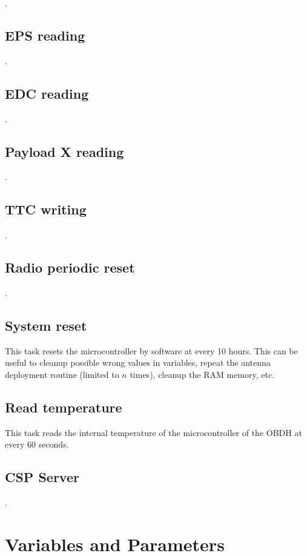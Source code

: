 .

\subsection{EPS reading}

.

\subsection{EDC reading}

.

\subsection{Payload X reading}

.

\subsection{TTC writing}

.

\subsection{Radio periodic reset}

.

\subsection{System reset}

This task resets the microcontroller by software at every 10 hours. This can be useful to cleanup possible wrong values in variables, repeat the antenna deployment routine (limited to $n$ times), cleanup the RAM memory, etc.

\subsection{Read temperature}

This task reads the internal temperature of the microcontroller of the OBDH at every 60 seconds.

\subsection{CSP Server}

.

\section{Variables and Parameters}


